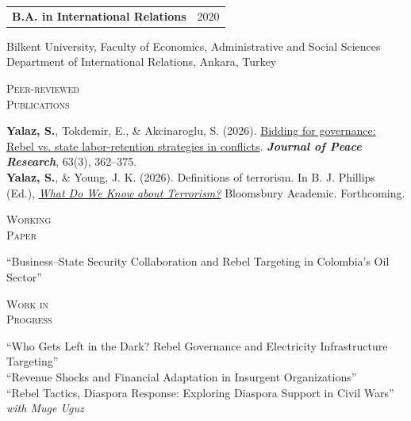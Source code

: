 \documentclass[10pt,letterpaper]{article}
\makeatletter
\newlength{\labelcol}
\newlength{\colgap}
\newcommand{\cvrow}[2]{%
  \noindent
  \begin{minipage}[t]{\labelcol}
    \vspace{0pt}
    \raggedright\textsc{#1}
  \end{minipage}%
  \hspace{\colgap}%
  \begin{minipage}[t]{%
    \dimexpr\textwidth-\labelcol-\colgap\relax
  }
    \vspace{0pt}
    \raggedright #2
  \end{minipage}\par
}
\newcommand{\datedline}[2]{%
  \noindent
  \begin{tabularx}{\linewidth}{%
    @{}
    >{\raggedright\arraybackslash}X
    >{\raggedleft\arraybackslash\small}p{1.65in}
    @{}
  }
    #1 & #2
  \end{tabularx}\par
}
\newcommand{\entrygap}{\vspace{0.75em}}
\newcommand{\sectiongap}{\vspace{1.30em}}
\newcommand{\journal}[1]{\textbf{\textit{#1}}}
\makeatother
\begin{document}
\entrygap

\cvrow{}{%
  \datedline{%
    \textbf{B.A. in International Relations}
  }{2020}

  Bilkent University, Faculty of Economics, Administrative and
  Social Sciences\\
  Department of International Relations, Ankara, Turkey
}

\sectiongap


\cvrow{Peer-reviewed\\Publications}{%
  \textbf{Yalaz, S.}, Tokdemir, E., \& Akcinaroglu, S. (2026).
  \href{https://academic.oup.com/jpr/article/63/3/362/8524882}{Bidding
  for governance: Rebel vs. state labor-retention strategies
  in conflicts}.
  \journal{Journal of Peace Research}, 63(3), 362--375.\\[0.75em]
  \textbf{Yalaz, S.}, \& Young, J. K. (2026).
  Definitions of terrorism.
  In B. J. Phillips (Ed.),
  \href{https://www.bloomsbury.com/us/what-do-we-know-about-terrorism-9798765151990/}{\textit{What Do We Know about Terrorism?}}
  Bloomsbury Academic. Forthcoming.
}

\sectiongap


\cvrow{Working\\Paper}{%
  ``Business--State Security Collaboration and Rebel Targeting
  in Colombia's Oil Sector''
}

\sectiongap


\cvrow{Work in\\Progress}{%
  ``Who Gets Left in the Dark? Rebel Governance and
  Electricity Infrastructure Targeting''\\[0.75em]
  ``Revenue Shocks and Financial Adaptation in Insurgent
  Organizations''\\[0.75em]
  ``Rebel Tactics, Diaspora Response: Exploring Diaspora Support
  in Civil Wars'' \textit{with Muge Uguz}
}

\sectiongap

\end{document}
